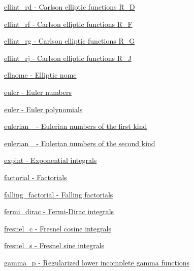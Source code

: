 \begin{DoxyItemize}
\item \hyperlink{group__gnu__math__spec__func_gad29dae6abc783c8fe952dba477e65309}{ellint\+\_\+rd -\/ Carlson elliptic functions R\+\_\+D}
\item \hyperlink{group__gnu__math__spec__func_gae4859494464c7eaf98193f92b2235bc1}{ellint\+\_\+rf -\/ Carlson elliptic functions R\+\_\+F}
\item \hyperlink{group__gnu__math__spec__func_gadf618529d6106c1c1bc1e9212c4fed12}{ellint\+\_\+rg -\/ Carlson elliptic functions R\+\_\+G}
\item \hyperlink{group__gnu__math__spec__func_gadccabc8df929cc03745286ed1574a3ba}{ellint\+\_\+rj -\/ Carlson elliptic functions R\+\_\+J}
\item \hyperlink{group__gnu__math__spec__func_ga7bfb34f8b5c0ed7c72040f9cb7034bba}{ellnome -\/ Elliptic nome}
\item \hyperlink{group__gnu__math__spec__func_gac956e6457ab7d0d1765d281e73073f55}{euler -\/ Euler numbers}
\item \hyperlink{group__gnu__math__spec__func_gac956e6457ab7d0d1765d281e73073f55}{euler -\/ Euler polynomials}
\item \hyperlink{group__gnu__math__spec__func_gadfd8810a97655d2cdd1b0e3af68a79d3}{eulerian\+\_ -\/ Eulerian numbers of the first kind}
\item \hyperlink{group__gnu__math__spec__func_ga9bc456941d5e35cf54ec9c50f2e52884}{eulerian\+\_ -\/ Eulerian numbers of the second kind}
\item \hyperlink{group__gnu__math__spec__func_gadaf9317953b826975da72d1858f01ea5}{expint -\/ Exponential integrals}
\item \hyperlink{group__gnu__math__spec__func_ga963b1612f50b0964f5f42c9f289aab68}{factorial -\/ Factorials}
\item \hyperlink{group__gnu__math__spec__func_ga3cc8eb6068c7155ec48b40e20160c5c0}{falling\+\_\+factorial -\/ Falling factorials}
\item \hyperlink{group__gnu__math__spec__func_ga5468fbaed5cb8384cff7cfb9d2188d1a}{fermi\+\_\+dirac -\/ Fermi-\/\+Dirac integrals}
\item \hyperlink{group__gnu__math__spec__func_ga92a3585165bfad3f9972fb4210140d22}{fresnel\+\_\+c -\/ Fresnel cosine integrals}
\item \hyperlink{group__gnu__math__spec__func_ga075a32b4f59a5fa67c2e28232c89ad45}{fresnel\+\_\+s -\/ Fresnel sine integrals}
\item \hyperlink{group__gnu__math__spec__func_ga692601fa7508c0b97bf549e6362a49b9}{gamma\+\_\+p -\/ Regularized lower incomplete gamma functions}

\end{DoxyItemize}
